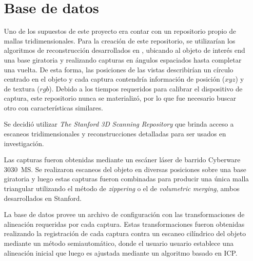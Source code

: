 \section{Base de datos}
Uno de los supuestos de este proyecto era contar con un repositorio propio de
mallas tridimensionales.
Para la creación de este repositorio,
se utilizarían los algoritmos de reconstrucción desarrollados en \cite{Pancho},
ubicando al objeto de interés end una base giratoria y realizando capturas
en ángulos espaciados hasta completar una vuelta.
De esta forma, las posiciones de las vistas describirían un círculo centrado en el objeto y
cada captura contendría información de posición ($xyz$) y de textura ($rgb$).
Debido a los tiempos requeridos para calibrar el dispositivo de captura,
este repositorio nunca se materializó,
 por lo que fue necesario buscar otro con características similares.


Se decidió utilizar \emph{The Stanford 3D Scanning Repository}\cite{StanfordScanRep} que brinda
acceso a escaneos tridimensionales y reconstrucciones detalladas para ser
usados en investigación.

Las capturas fueron obtenidas mediante un escáner láser de barrido Cyberware
3030~MS.  Se realizaron escaneos del objeto en diversas posiciones sobre una
base giratoria y luego estas capturas fueron combinadas para producir una única
malla triangular utilizando el método de \emph{zippering} o el de
\emph{volumetric merging}, ambos desarrollados en
Stanford\cite{StanfordScanRep}. 

La base de datos provee un archivo de configuración con las transformaciones de
alineación requeridas por cada captura.
Estas transformaciones fueron obtenidas realizando la registración de cada captura
contra un escaneo cilíndrico del objeto mediante un método semiautomático, donde el usuario
usuario establece una alineación inicial que luego es ajustada mediante un algoritmo
basado en ICP\cite{Turk:1994:ZPM:192161.192241}.

